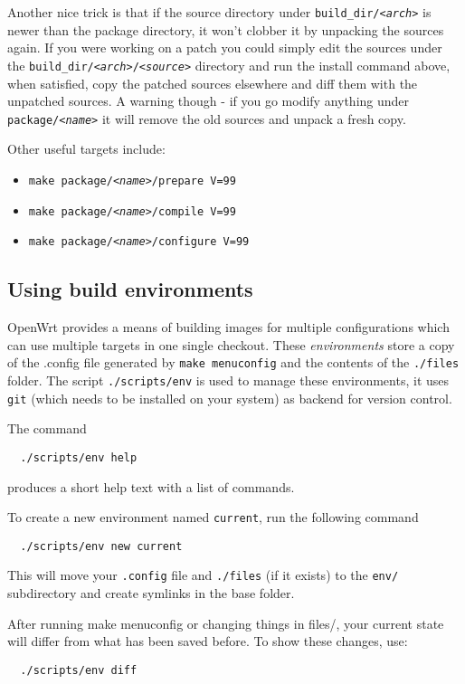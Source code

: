 Another nice trick is that if the source directory under \texttt{build\_dir/\textit{<arch>}}
is newer than the package directory, it won't clobber it by unpacking the sources again.
If you were working on a patch you could simply edit the sources under the
\texttt{build\_dir/\textit{<arch>}/\textit{<source>}} directory and run the install command above,
when satisfied, copy the patched sources elsewhere and diff them with the unpatched
sources. A warning though - if you go modify anything under \texttt{package/\textit{<name>}}
it will remove the old sources and unpack a fresh copy.

Other useful targets include:

\begin{itemize}
    \item \texttt{make package/\textit{<name>}/prepare V=99}
    \item \texttt{make package/\textit{<name>}/compile V=99}
    \item \texttt{make package/\textit{<name>}/configure V=99}
\end{itemize}


\subsection{Using build environments}
OpenWrt provides a means of building images for multiple configurations
which can use multiple targets in one single checkout. These \emph{environments}
store a copy of the .config file generated by \texttt{make menuconfig} and the contents
of the \texttt{./files} folder.
The script \texttt{./scripts/env} is used to manage these environments, it uses
\texttt{git} (which needs to be installed on your system) as backend for version control.

The command 
\begin{Verbatim}
  ./scripts/env help
\end{Verbatim}
produces a short help text with a list of commands.

To create a new environment named \texttt{current}, run the following command
\begin{Verbatim}
  ./scripts/env new current
\end{Verbatim}
This will move your \texttt{.config} file and \texttt{./files} (if it exists) to
the \texttt{env/} subdirectory and create symlinks in the base folder.

After running make menuconfig or changing things in files/, your current state will
differ from what has been saved before. To show these changes, use:
\begin{Verbatim}
  ./scripts/env diff
\end{Verbatim}

